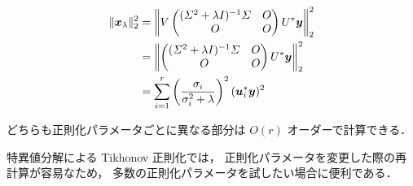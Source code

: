 \begin{align}
    \|\bm{x}_{\lambda}\|_2^2
     & = \left\| V
    \begin{pmatrix}
        (\varSigma^2 + \lambda I)^{-1} \varSigma & O \\
        O                                  & O
    \end{pmatrix}
    U^* \bm{y} \right\|_2^2
    \notag                                                                                          \\
     & = \left\|
    \begin{pmatrix}
        (\varSigma^2 + \lambda I)^{-1} \varSigma & O \\
        O                                  & O
    \end{pmatrix}
    U^* \bm{y} \right\|_2^2
    \notag                                                                                          \\
     & = \sum_{i = 1}^r \left(\frac{\sigma_i}{\sigma_i^2 + \lambda}\right)^2  (\bm{u}_i^* \bm{y})^2
    \label{eq:regularization_tikhonov_regularization-term-by-svd}
\end{align}

どちらも正則化パラメータごとに異なる部分は $O(r)$ オーダーで計算できる．

特異値分解による Tikhonov 正則化では，
正則化パラメータを変更した際の再計算が容易なため，
多数の正則化パラメータを試したい場合に便利である．
